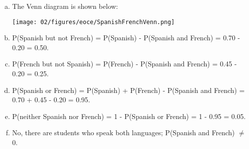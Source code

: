 
{
{
\begin{enumerate}[(a)]
\setlength{\itemsep}{0mm}
\item The Venn diagram is shown below:
\begin{center}
\texttt{[image: 02/figures/eoce/SpanishFrenchVenn.png]}
\end{center}
\item P(Spanish but not French) = P(Spanish) - P(Spanish and French) = 0.70 - 0.20 = 0.50.
\item P(French but not Spanish) = P(French) - P(Spanish and French) = 0.45 - 0.20 = 0.25.
\item P(Spanish or French) = P(Spanish) + P(French) - P(Spanish and French) = 0.70 + 0.45 - 0.20 = 0.95.
\item P(neither Spanish nor French) = 1 - P(Spanish or French)  = 1 - 0.95 = 0.05.
\item No, there are students who speak both languages; P(Spanish and French) $\ne$ 0.
\end{enumerate}
}\label{languages}
}



